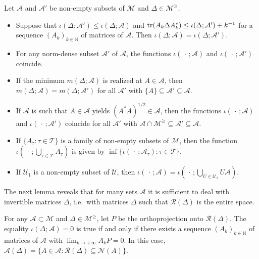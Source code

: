 \documentclass{amsart}
\begin{document}
\begin{lem} \label{l2.2}
Let $\mathcal A$ and ${\mathcal A}'$ be non-empty subsets of $\mathcal M$ and $\Delta \in {\mathcal M}^\geq$.
   \begin{itemize}
       \item[(i)]  Suppose that $\iota(\Delta;{\mathcal A}') \leq \iota(\Delta;{\mathcal A})$ and  ${\rm tr}( A_k \Delta A_k^*) \leq \iota(\Delta;{\mathcal A}') + k^{-1}$ for a sequence $(A_k)_{k\in {\mathbb N}}$ of matrices of $\mathcal A$. Then $\iota(\Delta;{\mathcal A}) = \iota(\Delta;{\mathcal A}')$.
       \item[(ii)] For any norm-dense subset ${\mathcal A}'$ of ${\mathcal A}$, the functions $\iota(\,\cdot\,;{\mathcal A})$ and $\iota(\,\cdot\,;{\mathcal A}')$ coincide.
       \item[(iii)] If the minimum $m(\Delta;{\mathcal A})$ is realized at $A\in {\mathcal A}$, then $m(\Delta;{\mathcal A}) = m(\Delta;{\mathcal A}')$ for all ${\mathcal A}'$ with $\{A\} \subseteq {\mathcal A}' \subseteq {\mathcal A}$.
       \item[(iv)] If ${\mathcal A}$ is such that $A\in {\mathcal A}$ yields $(A^* A)^{1/2} \in {\mathcal A}$, then the functions $\iota(\,\cdot\,;{\mathcal A})$ and $\iota(\,\cdot\,;{\mathcal A}')$ coincide for all ${\mathcal A}'$ with  ${\mathcal A} \cap  {\mathcal M}^{\geq} \subseteq {\mathcal A}' \subseteq {\mathcal A}$.
       \item[(v)] If $\{ A_\tau : \tau\in {\mathcal T}\}$ is a family of non-empty subsets of $\mathcal M$, then the function
 $\iota(\,\cdot\,;\bigcup_{\tau \in {\mathcal T}}\!\!A_\tau)$ is given by $\inf \{  \iota(\,\cdot\,;{\mathcal A}_\tau) : \tau\in {\mathcal T}\}$.
\item[(vi)] If ${\mathcal U}_1$ is a non-empty subset of $\mathcal U$, then $\iota(\,\cdot\,;{\mathcal A}) = \iota(\,\cdot\,;\bigcup_{U \in {\mathcal U}_1}\!U{\mathcal A})$.
\end{itemize}
\end{lem}


The next lemma reveals that for many sets $\mathcal A$ it is sufficient to deal with invertible matrices $\Delta$, i.e.~with matrices $\Delta$ such that ${\mathcal R}(\Delta)$ is the entire space.

\begin{lem} \label{l2.3}
    For any ${\mathcal A} \subset {\mathcal M}$ and $\Delta \in {\mathcal M}^\geq$, let $P$ be the orthoprojection onto ${\mathcal R}(\Delta)$. The equality $\iota(\Delta;{\mathcal A}) = 0$ is true if and only if there exists a sequence $(A_k)_{k\in{\mathbb N}}$ of matrices of $\mathcal A$ with $\lim_{k\to+\infty} A_kP = 0$. In this case, ${\mathcal A}(\Delta) = \{ A\in{\mathcal A} : {\mathcal R}(\Delta) \subseteq {\mathcal N}(A) \}$.
\end{lem}
\end{document}
